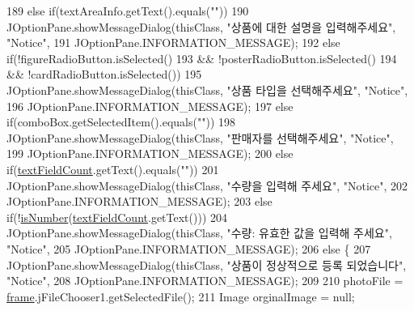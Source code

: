 \begin{DoxyCode}
189                 \textcolor{keywordflow}{else} \textcolor{keywordflow}{if}(textAreaInfo.getText().equals(\textcolor{stringliteral}{""}))
190                     JOptionPane.showMessageDialog(thisClass, \textcolor{stringliteral}{"상품에 대한 설명을 입력해주세요"}, \textcolor{stringliteral}{"Notice"}, 
191                             JOptionPane.INFORMATION\_MESSAGE);
192                 \textcolor{keywordflow}{else} \textcolor{keywordflow}{if}(!figureRadioButton.isSelected()
193                         && !posterRadioButton.isSelected()
194                         && !cardRadioButton.isSelected())
195                     JOptionPane.showMessageDialog(thisClass, \textcolor{stringliteral}{"상품 타입을 선택해주세요"}, \textcolor{stringliteral}{"Notice"}, 
196                             JOptionPane.INFORMATION\_MESSAGE);
197                 \textcolor{keywordflow}{else} \textcolor{keywordflow}{if}(comboBox.getSelectedItem().equals(\textcolor{stringliteral}{""}))
198                     JOptionPane.showMessageDialog(thisClass, \textcolor{stringliteral}{"판매자를 선택해주세요"}, \textcolor{stringliteral}{"Notice"}, 
199                             JOptionPane.INFORMATION\_MESSAGE);
200                 \textcolor{keywordflow}{else} \textcolor{keywordflow}{if}(\hyperlink{classpkg_1_1_product_u_i_ac35d0e67c152e5bcc6cdf3b9cc79f90b}{textFieldCount}.getText().equals(\textcolor{stringliteral}{""}))
201                     JOptionPane.showMessageDialog(thisClass, \textcolor{stringliteral}{"수량을 입력해 주세요"}, \textcolor{stringliteral}{"Notice"}, 
202                             JOptionPane.INFORMATION\_MESSAGE);
203                 \textcolor{keywordflow}{else} \textcolor{keywordflow}{if}(!\hyperlink{classpkg_1_1_product_u_i_a643538618cd15aa1607227e9f398554b}{isNumber}(\hyperlink{classpkg_1_1_product_u_i_ac35d0e67c152e5bcc6cdf3b9cc79f90b}{textFieldCount}.getText()))
204                     JOptionPane.showMessageDialog(thisClass, \textcolor{stringliteral}{"수량: 유효한 값을 입력해 주세요"}, \textcolor{stringliteral}{"Notice"}, 
205                             JOptionPane.INFORMATION\_MESSAGE);
206                 \textcolor{keywordflow}{else} \{
207                     JOptionPane.showMessageDialog(thisClass, \textcolor{stringliteral}{"상품이 정상적으로 등록 되었습니다"}, \textcolor{stringliteral}{"Notice"}, 
208                             JOptionPane.INFORMATION\_MESSAGE);
209                     
210                     photoFile = \hyperlink{classpkg_1_1_product_u_i_a49f9ae805cdac34c866e6c1593b6e625}{frame}.jFileChooser1.getSelectedFile();
211                     Image orginalImage = null;

\end{DoxyCode}
